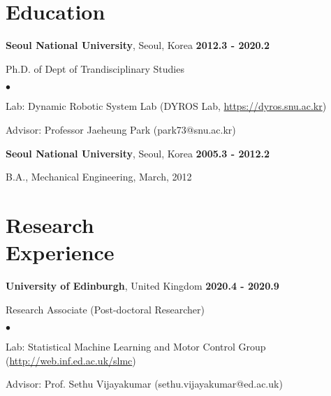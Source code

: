 \documentclass[margin,line]{res}
\newenvironment{list1}{
  \begin{list}{\ding{113}}{%
      \setlength{\itemsep}{0in}
      \setlength{\parsep}{0in} \setlength{\parskip}{0in}
      \setlength{\topsep}{0in} \setlength{\partopsep}{0in} 
      \setlength{\leftmargin}{0.17in}}}{\end{list}}
\newenvironment{list2}{
  \begin{list}{$\bullet$}{%
      \setlength{\itemsep}{0in}
      \setlength{\parsep}{0in} \setlength{\parskip}{0in}
      \setlength{\topsep}{0in} \setlength{\partopsep}{0in} 
      \setlength{\leftmargin}{0.2in}}}{\end{list}}
\begin{document}
\begin{resume}
  \section{\sc Education}

   {\bf Seoul National University}, Seoul, Korea  \hfill {\bf 2012.3 - 2020.2} \\
  \vspace*{-.1in}
  \begin{list1}
    \vspace*{-.05in}
    \item[] Ph.D.  of Dept of Trandisciplinary Studies
    \begin{list2}
      \item Lab: Dynamic Robotic System Lab (DYROS Lab, \url{https://dyros.snu.ac.kr})
      \item Advisor: Professor Jaeheung Park (park73@snu.ac.kr)
    \end{list2}
  \end{list1}

  {\bf Seoul National University}, Seoul, Korea  \hfill {\bf 2005.3 - 2012.2} \\
  \vspace*{-.1in}
  \begin{list1}
    \vspace*{-.05in}
    \item[] B.A., Mechanical Engineering,  March, 2012
  \end{list1}

  \section{\sc Research \\Experience}

   {\bf University of Edinburgh}, United Kingdom  \hfill {\bf 2020.4 - 2020.9} \\
  \vspace*{-.1in}
  \begin{list1}
    \vspace*{-.05in}
    \item[] Research Associate (Post-doctoral Researcher)
    \begin{list2}
      \item Lab:  Statistical Machine Learning and Motor Control Group (\url{http://web.inf.ed.ac.uk/slmc})
      \item Advisor: Prof. Sethu Vijayakumar (sethu.vijayakumar@ed.ac.uk)
    \end{list2}
  \end{list1}


\end{resume}
\end{document}
